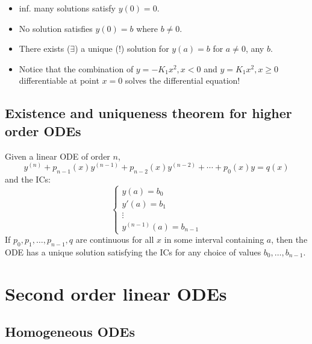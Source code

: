 \documentclass{article}
\newcommand{\tmtextbf}[1]{\text{{\bfseries{#1}}}}
\begin{document}
\begin{enumerate}
  \begin{center}
  \end{center}
  \begin{itemize}
    \item inf. many solutions satisfy $y (0) = 0$.
    
    \item No solution satisfies $y (0) = b$ where $b \neq 0$.
    
    \item There exists ($\exists$) a unique (!) solution for $y (a) = b$ for
    $a \neq 0$, any $b$.
    
    \item Notice that the combination of $y = - K_1 x^2, x < 0$ and $y = K_1
    x^2, x \geq 0$ \tmtextbf{is} differentiable at point $x = 0$
    \tmtextbf{and} solves the differential equation!
  \end{itemize}
\end{enumerate}

\subsection{Existence and uniqueness theorem for higher order ODEs}

Given a linear ODE of order $n$,
\[ y^{(n)} + p_{n - 1} (x) y^{(n - 1)} + p_{n - 2} (x) y^{(n - 2)} + \cdots +
   p_0 (x) y = q (x) \]
and the ICs:
\[ \left\{\begin{array}{l}
     y (a) = b_0\\
     y' (a) = b_1\\
     \vdots\\
     y^{(n - 1)} (a) = b_{n - 1}
   \end{array}\right. \]
If $p_0, p_1, \ldots, p_{n - 1}, q$ are continuous for all $x$ in some
interval containing $a$, then the ODE has a unique solution satisfying the ICs
for any choice of values $b_0, \ldots, b_{n - 1}$.

\section{Second order linear ODEs}

\subsection{Homogeneous ODEs}
\end{document}
